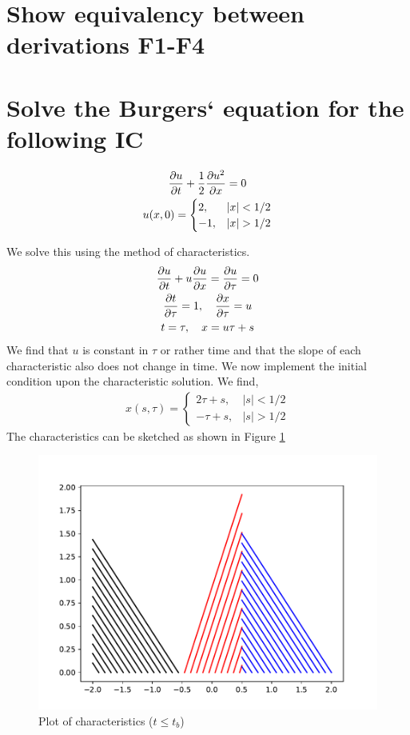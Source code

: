 \documentclass{article}
\begin{document}
\section{Show equivalency between derivations F1-F4}


\section{Solve the Burgers` equation for the following IC}
\begin{gather*}
    \frac{\partial u}{\partial t} + \frac{1}{2}\frac{\partial u^2}{\partial x} = 0 \\
    u(x,0) = \begin{cases}
        2, & |x| < 1/2\\
        -1, & |x|  > 1/2
        \end{cases}
\end{gather*}

We solve this using the method of characteristics. 
\begin{gather}
    \frac{\partial u}{\partial t} + u\frac{\partial u}{\partial x} = \frac{\partial u}{\partial \tau} = 0\\
    \frac{\partial t}{\partial \tau} = 1, \quad \frac{\partial x}{\partial \tau} = u\\
    t = \tau, \quad x = u\tau + s
\end{gather}
We find that $u$ is constant in $\tau$ or rather time and that the slope of each
characteristic also does not change in time. We now implement the initial
condition upon the characteristic solution. We find,
\begin{gather}
    x(s,\tau) = \begin{cases}
        2\tau + s, & |s| < 1/2\\
        -\tau + s, & |s| > 1/2
        \end{cases}
\end{gather}
The characteristics can be sketched as shown in Figure \ref{fig:prob2_plot}

\begin{figure}[t]
    \centering
    \includegraphics[width=.8\textwidth]{prob2_plot.pdf}
    \caption{Plot of characteristics ($t \le t_b$)}
    \label{fig:prob2_plot}
\end{figure}
\end{document}
